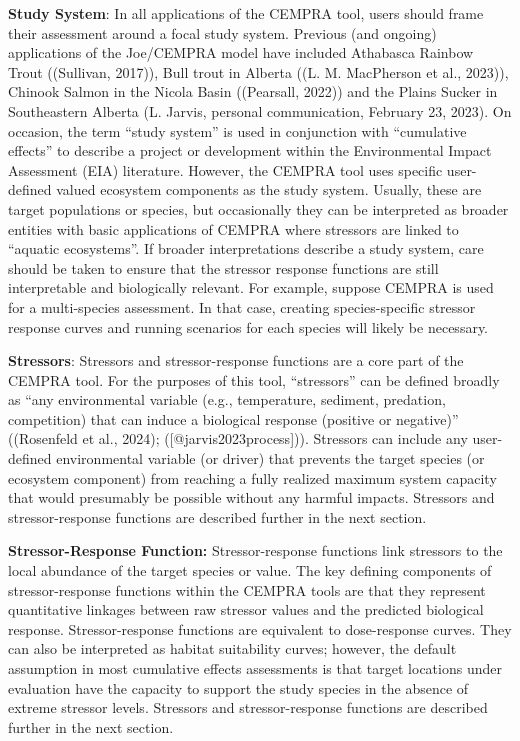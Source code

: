 \documentclass[
  letterpaper,
  DIV=11,
  numbers=noendperiod]{scrreprt}
\begin{document}
\textbf{Study System}: In all applications of the CEMPRA tool, users
should frame their assessment around a focal study system. Previous (and
ongoing) applications of the Joe/CEMPRA model have included Athabasca
Rainbow Trout ((Sullivan, 2017)), Bull trout in Alberta ((L. M.
MacPherson et al., 2023)), Chinook Salmon in the Nicola Basin
((Pearsall, 2022)) and the Plains Sucker in Southeastern Alberta (L.
Jarvis, personal communication, February 23, 2023). On occasion, the
term ``study system'' is used in conjunction with ``cumulative effects''
to describe a project or development within the Environmental Impact
Assessment (EIA) literature. However, the CEMPRA tool uses specific
user-defined valued ecosystem components as the study system. Usually,
these are target populations or species, but occasionally they can be
interpreted as broader entities with basic applications of CEMPRA where
stressors are linked to ``aquatic ecosystems''. If broader
interpretations describe a study system, care should be taken to ensure
that the stressor response functions are still interpretable and
biologically relevant. For example, suppose CEMPRA is used for a
multi-species assessment. In that case, creating species-specific
stressor response curves and running scenarios for each species will
likely be necessary.

\textbf{Stressors}: Stressors and stressor-response functions are a core
part of the CEMPRA tool. For the purposes of this tool, ``stressors''
can be defined broadly as ``any environmental variable (e.g.,
temperature, sediment, predation, competition) that can induce a
biological response (positive or negative)'' ((Rosenfeld et al., 2024);
([@jarvis2023process])). Stressors can include any user-defined
environmental variable (or driver) that prevents the target species (or
ecosystem component) from reaching a fully realized maximum system
capacity that would presumably be possible without any harmful impacts.
Stressors and stressor-response functions are described further in the
next section.

\textbf{Stressor-Response Function:} Stressor-response functions link
stressors to the local abundance of the target species or value. The key
defining components of stressor-response functions within the CEMPRA
tools are that they represent quantitative linkages between raw stressor
values and the predicted biological response. Stressor-response
functions are equivalent to dose-response curves. They can also be
interpreted as habitat suitability curves; however, the default
assumption in most cumulative effects assessments is that target
locations under evaluation have the capacity to support the study
species in the absence of extreme stressor levels. Stressors and
stressor-response functions are described further in the next section.
\end{document}
